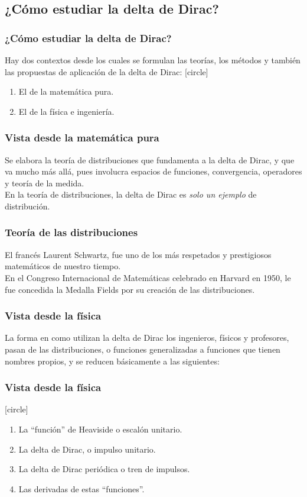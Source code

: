 \subsection{¿Cómo estudiar la delta de Dirac?}
\begin{frame}
\frametitle{¿Cómo estudiar la delta de Dirac?}
Hay dos contextos desde los cuales se formulan las teorías, los métodos y también las propuestas de aplicación de la delta de Dirac:
[circle]
\begin{enumerate}[<+->]
\item El de la matemática pura.
\item El de la física e ingeniería.
\end{enumerate}
\end{frame}
\begin{frame}
\frametitle{Vista desde la matemática pura}
Se elabora la teoría de distribuciones que fundamenta a la delta de Dirac, y que va mucho más allá, pues involucra espacios de funciones, convergencia, operadores y teoría de la medida.
\\
\bigskip
\pause
En la teoría de distribuciones, la delta de Dirac es \emph{solo un ejemplo} de distribución.
\end{frame}
\begin{frame}
\frametitle{Teoría de las distribuciones}
El francés Laurent Schwartz, fue uno de los más respetados y prestigiosos matemáticos de nuestro tiempo.
\\
\bigskip
En el Congreso Internacional de Matemáticas celebrado en Harvard en 1950, le fue concedida la Medalla Fields por su creación de las distribuciones. 
\end{frame}
\begin{frame}
\frametitle{Vista desde la física}
La forma en como utilizan la delta de Dirac los ingenieros, físicos y profesores, pasan de las distribuciones, o funciones generalizadas a funciones que tienen nombres propios, y se reducen básicamente a las siguientes:
\end{frame}
\begin{frame}
\frametitle{Vista desde la física}
[circle]
\begin{enumerate}[<+->]
\item La \enquote{función} de Heaviside o escalón unitario.
\item La delta de Dirac, o impulso unitario.
\item La delta de Dirac periódica o tren de impulsos.
\item Las derivadas de estas \enquote{funciones}.
\end{enumerate}
\end{frame}
